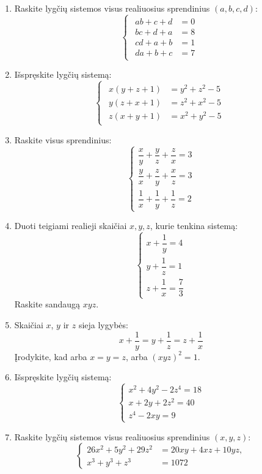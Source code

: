 \documentclass[11pt,a4paper]{scrartcl}
\begin{document}
\begin{enumerate}
    \item Raskite lygčių sistemos visus realiuosius sprendinius $(a,b,c,d)$:
    \[
    \begin{cases} 
    \begin{aligned}
    ab+c+d&=0 \\
    bc+d+a &= 8\\
    cd+a+b&=1\\
    da+b+c&=7
    \end{aligned}
    \end{cases}
    \]

    \item Išspręskite lygčių sistemą:
    \[
    \begin{cases}
    \begin{aligned} 
    x(y+z+1)&=y^2+z^2-5 \\
    y(z+x+1)&=z^2+x^2-5\\
    z(x+y+1)&=x^2+y^2-5
    \end{aligned}
    \end{cases}
    \]

    \item Raskite visus sprendinius:
    \[
    \left\{
    \begin{array}{l}
    \dfrac{x}{y}+\dfrac{y}{z}+\dfrac{z}{x}=3\\[0.3cm]
    \dfrac{y}{x}+\dfrac{z}{y}+\dfrac{x}{z}=3\\[0.3cm]
    \dfrac{1}{x}+\dfrac{1}{y}+\dfrac{1}{z}=2
    \end{array}
    \right.
    \]

    \item Duoti teigiami realieji skaičiai $x,y,z$, kurie tenkina sistemą:
    \[
    \left\{
    \begin{array}{l}
    x+\dfrac{1}{y}=4\\[0.2cm]
    y+\dfrac{1}{z}=1\\[0.2cm]
    z+\dfrac{1}{x}=\dfrac{7}{3}
    \end{array}
    \right.
    \]
    Raskite sandaugą $xyz$.

    \item Skaičiai $x$, $y$ ir $z$ sieja lygybės:
    $$x+\frac{1}{y}=y+\frac{1}{z}=z+\frac{1}{x}$$
    Įrodykite, kad arba $x=y=z$, arba $(xyz)^2=1$.

    \item Išspręskite lygčių sistemą:
    \[
    \left\{
    \begin{array}{l}
    x^2+4y^2-2z^4=18\\
    x+2y+2z^2=40\\
    z^4-2xy=9
    \end{array}
    \right.
    \]

    \item Raskite lygčių sistemos visus realiuosius sprendinius $(x,y,z)$:
    \[
    \left\{
    \begin{aligned}
    26x^2+5y^2+29z^2 &= 20xy+4xz+10yz,\\
    x^3+y^3+z^3 &= 1072
    \end{aligned}
    \right.
    \]
\end{enumerate}
\end{document}
